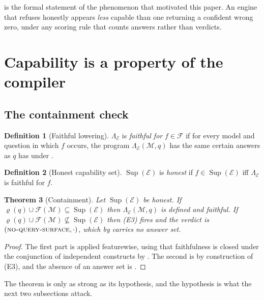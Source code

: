 \documentclass[11pt,a4paper]{article}
\theoremstyle{plain}
\newtheorem{theorem}{Theorem}[section]
\theoremstyle{definition}
\newtheorem{definition}[theorem]{Definition}
\theoremstyle{remark}
\newcommand{\Model}{\mathcal{M}}          %
\newcommand{\Engine}{\mathcal{E}}         %
\newcommand{\Feat}{\mathcal{F}}           %
\newcommand{\req}{\varrho}                %
\renewcommand{\sup}{\operatorname{Sup}}   %
\newcommand{\vsurf}{\textsc{no-query-surface}}
\newcommand{\lowr}{\Lambda}               %
\newcommand{\qq}{q}
\begin{document}
 is the formal statement of the phenomenon that
motivated this paper. An engine that refuses honestly appears \emph{less}
capable than one returning a confident wrong zero, under any scoring rule that
counts answers rather than verdicts.

\section{Capability is a property of the compiler}
\label{sec:capability}

\subsection{The containment check}

\begin{definition}[Faithful lowering]
\label{def:faithful}
$\lowr_\Engine$ is \emph{faithful for} $f \in \Feat$ if for every model and
question in which $f$ occurs, the program $\lowr_\Engine(\Model,\qq)$ has the
same certain answers as $\qq$ has under .
\end{definition}

\begin{definition}[Honest capability set]
\label{def:honest}
$\sup(\Engine)$ is \emph{honest} if $f \in \sup(\Engine)$ iff
$\lowr_\Engine$ is faithful for $f$.
\end{definition}

\begin{theorem}[Containment]
\label{thm:containment}
Let $\sup(\Engine)$ be honest. If $\req(\qq) \cup \Feat(\Model) \subseteq
\sup(\Engine)$ then $\lowr_\Engine(\Model,\qq)$ is defined and faithful. If
$\req(\qq) \cup \Feat(\Model) \not\subseteq \sup(\Engine)$ then
(E3) fires and the verdict is $(\vsurf, \cdot)$, which by
 carries no answer set.
\end{theorem}

\begin{proof}
The first part is  applied featurewise, using that
faithfulness is closed under the conjunction of independent constructs by
. The second is by construction of (E3), and the absence of
an answer set is .
\end{proof}

The theorem is only as strong as its hypothesis, and the hypothesis is what
the next two subsections attack.
\end{document}
